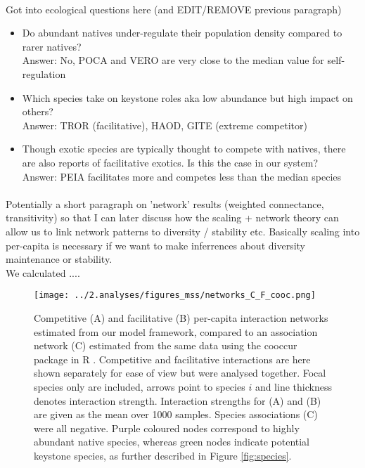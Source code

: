 \documentclass[a4,12pt]{article}
\begin{document}
    \paragraph{}
    Got into ecological questions here (and EDIT/REMOVE previous paragraph)
        \begin{itemize}
            \item Do abundant natives under-regulate their population density compared to rarer natives? \\
            Answer: No, POCA and VERO are very close to the median value for self-regulation
            \item Which species take on keystone roles aka low abundance but high impact on others? \\
            Answer: TROR (facilitative), HAOD, GITE (extreme competitor)
            \item Though exotic species are typically thought to compete with natives, there are also reports of facilitative exotics. Is this the case in our system? \\
            Answer: PEIA facilitates more and competes less than the median species 
        \end{itemize}


    \paragraph{}
    Potentially a short paragraph on 'network' results (weighted connectance, transitivity) so that I can later discuss how the scaling + network theory can allow us to link network patterns to diversity / stability etc. Basically scaling into per-capita is necessary if we want to make inferrences about diversity maintenance or stability. \\
    We calculated .... 


    \begin{figure}[H]
        \begin{centering}
        \texttt{[image: ../2.analyses/figures\_mss/networks\_C\_F\_cooc.png]}
        \caption{Competitive (A) and facilitative (B) per-capita interaction networks estimated from our model framework, compared to an association network (C) estimated from the same data using the cooccur package in R \parencite{Griffith2016}. Competitive and facilitative interactions are here shown separately for ease of view but were analysed together. Focal species only are included, arrows point to species $i$ and line thickness denotes interaction strength. Interaction strengths for (A) and (B) are given as the mean over 1000 samples. Species associations (C) were all negative. 
        Purple coloured nodes correspond to highly abundant native species, whereas green nodes indicate potential keystone species, as further described in Figure \ref{fig:species}. }
        \label{fig:netwks}
       \end{centering}
    \end{figure}    
\end{document}
